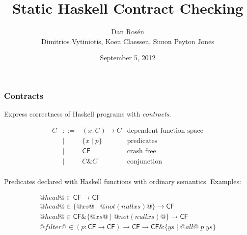 \documentclass[serif,professionalfont]{beamer}
\title{ {\huge Static Haskell Contract Checking} }
\institute{ Microsoft Research }
\author{ {\Large Dan Ros\'en}
     \vspace{\baselineskip} \\
     Dimitrios Vytiniotis, Koen Claessen, Simon Peyton Jones}
\date{September 5, 2012}
\begin{document}
\maketitle
\makeatactive

\newcommand{\unitcpo}{{\sf{\bf 1}}}
\newcommand{\Th}[0]{{\cal T}}
\newcommand{\alttr}[1]{#1^{m}}
\newcommand{\ol}[1]{\overline{#1}}
\newcommand{\Ct}{{\tt C}}
\newcommand{\CF}{{\tt CF}}
\newcommand{\roll}[1]{#1}
\newcommand{\unroll}[1]{#1}
\newcommand{\bind}[2]{#1(#2)}
\newcommand{\ret}[1]{#1}
\newcommand{\injK}[2]{\mathsf{#1}(#2)}
\newcommand{\injKZ}[1]{\mathsf{#1}}
\newcommand{\injFun}[1]{\mathsf{Fun}(#1)}
\newcommand{\injBad}{\mathsf{Bad}}
\newcommand{\dbrace}[1]{[\![#1]\!]}
\newcommand{\Fcf}{F_{\lcfZ}}
\newcommand{\lcfZ}{\textsf{cf}}
\newcommand{\dapp}{\mathsf{app}}
\newcommand\cf[0]{\mathsf{CF}}
\newcommand\conj[0]{\&}
\newcommand\cons[2]{\mathsf{cons}(#1,#2)}
\newcommand\conspi[1]{\mathsf{cons_0}(#1)}
\newcommand\conspii[1]{\mathsf{cons_1}(#1)}
\newcommand\nil[0]{\mathsf{nil}}
\newcommand\head[1]{\mathsf{head}(#1)}
\newcommand\maps[0]{\mathsf{map}}
\newcommand\map[2]{\maps(#1,#2)}
\newcommand\ptr[1]{#1_\mathsf{ptr}}
\newcommand\app[2]{\mathsf{ap}(#1,#2)}
\newcommand\appp[3]{\app{\app{#1}{#2}}{#3}}
\newcommand\unr[0]{@UNR@}
\newcommand\True[0]{@True@}
\newcommand\False[0]{@False@}
\newcommand\bad[0]{@BAD@}
\newcommand\formula[1]{#1}
\newcommand\highlight[1]{#1}
\newcommand{\taus}{\ol{\tau}}
\newcommand{\interp}[3]{[\![#1]\!]} %
\newcommand{\etrans}[3]{{\cal E}\{\!\!\{#3\}\!\!\}}
\newcommand{\ptrans}[2]{{\cal P}\{\!\!\{#2\}\!\!\}}
\newcommand{\trc}[1]{{\cal C}\{\!\!\{#1\}\!\!\}}
\newcommand\Min[0]{\mathsf{min}}


\begin{frame}[fragile]
  \frametitle{Contracts}

  Express correctness of Haskell programs with \emph{contracts}.

  \[\begin{array}{lcll}
    C & ::=  & (x : C) \to C  & \text{dependent function space} \\
      & \mid & \{ x \mid p \} & \text{predicates} \\
      & \mid & \cf            & \text{crash free} \\
      & \mid & C \conj C      & \text{conjunction} \\
  \end{array}\]

  Predicates declared with Haskell functions with ordinary semantics. Examples:

  \[\begin{array}{l}
    @head@ \in \cf \to \cf \\
    @head@ \in \{ @xs@ \mid @not (null xs)@ \} \to \cf \\
    @head@ \in \cf \conj \{ @xs@ \mid @not (null xs)@ \} \to \cf \\
    @filter@ \in (p : \cf \to \cf) \to \cf
                \to \cf \conj \{ ys \mid @all@ \; p \; ys \}
  \end{array}\]

\end{frame}
\end{document}
